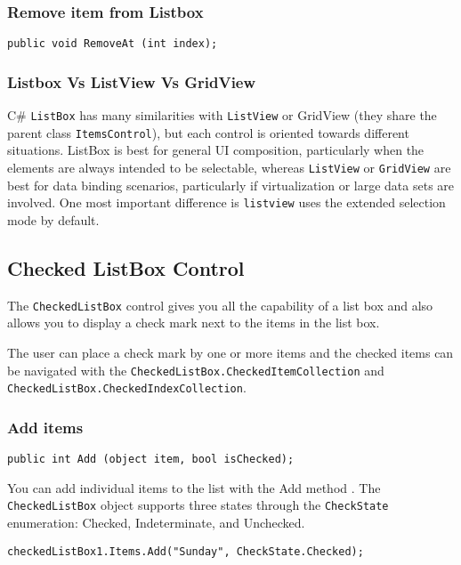 \subsubsection*{Remove item from Listbox}

\begin{lstlisting}[numbers=none]
public void RemoveAt (int index);
\end{lstlisting}

\subsubsection*{Listbox Vs ListView Vs GridView}
C\# \texttt{ListBox} has many similarities with \texttt{ListView} or GridView (they share the parent class \texttt{ItemsControl}), but each control is oriented towards different situations. ListBox is best for general UI composition, particularly when the elements are always intended to be selectable, whereas \texttt{ListView} or \texttt{GridView} are best for data binding scenarios, particularly if virtualization or large data sets are involved. One most important difference is \texttt{listview} uses the extended selection mode by default.

\subsection{Checked ListBox Control}
The \texttt{CheckedListBox} control gives you all the capability of a list box and also allows you to display a check mark next to the items in the list box.

The user can place a check mark by one or more items and the checked items can be navigated with the \verb*|CheckedListBox.CheckedItemCollection| and \verb*|CheckedListBox.CheckedIndexCollection|.

\subsubsection*{Add items}

\begin{lstlisting}[numbers=none]
public int Add (object item, bool isChecked);
\end{lstlisting}

You can add individual items to the list with the Add method . The \texttt{CheckedListBox} object supports three states through the \texttt{CheckState} enumeration: Checked, Indeterminate, and Unchecked.

\begin{lstlisting}[numbers=none]
checkedListBox1.Items.Add("Sunday", CheckState.Checked);
\end{lstlisting}

